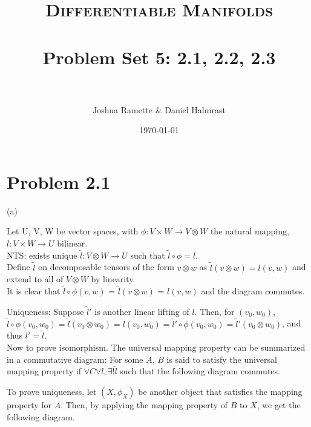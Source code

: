 \documentclass[paper=a4, fontsize=11pt]{scrartcl} %
\title{
\normalfont \normalsize 
\textsc{Differentiable Manifolds} \\ [25pt] %
\horrule{0.5pt} \\[0.4cm] %
\huge Problem Set 5: 2.1, 2.2, 2.3 \\ %
\horrule{2pt} \\[0.5cm] %
}
\author{Joshua Ramette \& Daniel Halmrast} %
\date{\normalsize\today} %
\numberwithin{equation}{section} %
\numberwithin{figure}{section} %
\numberwithin{table}{section} %
\begin{document}
\maketitle %


\section*{Problem 2.1}
(a)

Let U, V, W be vector spaces, with $\phi: V \times W \to V \otimes W$ the natural mapping, $ l: V \times W \to U$ bilinear. \\

NTS: exists unique $\widetilde{l}: V \otimes W \to U$ such that $\widetilde{l} \circ \phi = l$.\\

Define $\widetilde{l}$ on decomposable tensors of the form $v \otimes w$ as $\widetilde{l}(v \otimes w) = l(v,w)$ 
and extend to all of $V \otimes W$ by linearity. \\

It is clear that $\widetilde{l} \circ \phi(v, w) $ = $\widetilde{l} (v \otimes w) $ = $l(v,w)$ and the diagram commutes.

Uniqueness: Suppose $\widetilde{l}'$ is another linear lifting of $l$. 
Then, for $(v_0, w_0)$, 
$\widetilde{l} \circ \phi(v_0, w_0) = \widetilde{l}(v_0 \otimes w_0) = l(v_0,w_0) = \widetilde{l}' \circ \phi(v_0,w_0) = \widetilde{l}'(v_0 \otimes w_0)$,
and thus $\widetilde{l}' = \widetilde{l}$. \\

Now to prove isomorphism.
The universal mapping property can be summarized in a commutative diagram:
For some $A$, $B$ is said to satisfy the universal mapping property if $\forall C \forall l, \exists !\widetilde{l}$
such that the following diagram commutes.\\
\begin{center}
\end{center}

To prove uniqueness, let $(X, \phi_X)$ be another object that satisfies the mapping property for $A$.
Then, by applying the mapping property of $B$ to $X$, we get the following diagram.
\begin{center}
\end{center}
\end{document}
